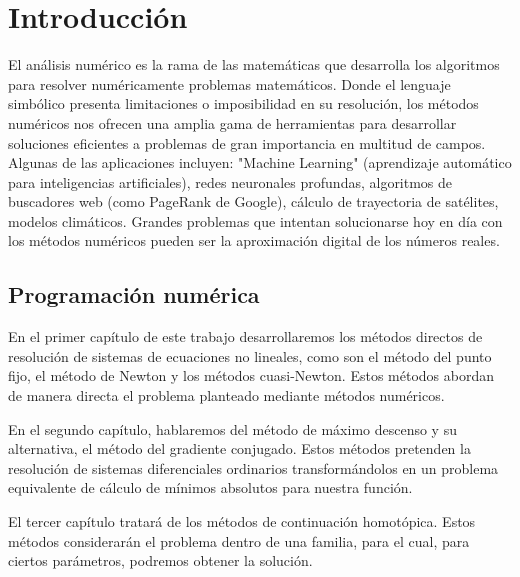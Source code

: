 \chapter*{Introducción}

El análisis numérico es la rama de las matemáticas que desarrolla los algoritmos para resolver numéricamente problemas matemáticos. Donde el lenguaje simbólico presenta limitaciones o imposibilidad en su resolución, los métodos numéricos nos ofrecen una amplia gama de herramientas para desarrollar soluciones eficientes a problemas de gran importancia en multitud de campos. Algunas de las aplicaciones incluyen: "Machine Learning" (aprendizaje automático para inteligencias artificiales), redes neuronales profundas, algoritmos de buscadores web (como PageRank de Google), cálculo de trayectoria de satélites, modelos climáticos. Grandes problemas que intentan solucionarse hoy en día con los métodos numéricos pueden ser la aproximación digital de los números reales. \\


\section*{Programación numérica}

En el primer capítulo de este trabajo desarrollaremos los métodos directos de resolución de sistemas de ecuaciones no lineales, como son el método del punto fijo, el método de Newton y los métodos cuasi-Newton. Estos métodos abordan de manera directa el problema planteado mediante métodos numéricos.

En el segundo capítulo, hablaremos del método de máximo descenso y su alternativa, el método del gradiente conjugado. Estos métodos pretenden la resolución de sistemas diferenciales ordinarios transformándolos en un problema equivalente de cálculo de mínimos absolutos para nuestra función.

El tercer capítulo tratará de los métodos de continuación homotópica. Estos métodos considerarán el problema dentro de una familia, para el cual, para ciertos parámetros, podremos obtener la solución.

